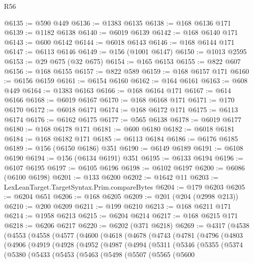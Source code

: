 \begin{lexlean}{R56}
\begin{coremodule}
@6135 := @590 @449
@6136 := @1383 @6135
@6138 := @168 @6136 @171
@6139 := @1182 @6138
@6140 := @6019 @6139
@6142 := @168 @6140 @171
@6143 := @600 @6142
@6144 := @6018 @6143
@6146 := @168 @6144 @171
@6147 := @6113 @6146
@6149 := @156 (@1001 @6147)
@6150 := @1013 @2595
@6153 := @29 @675 (@32 @675)
@6154 := @165 @6153
@6155 := @822 @607
@6156 := @168 @6155
@6157 := @822 @589
@6159 := @168 @6157 @171
@6160 := @6156 @6159
@6161 := @6154 @6160
@6162 := @164 @6161
@6163 := @608 @449
@6164 := @1383 @6163
@6166 := @168 @6164 @171
@6167 := @614 @6166
@6168 := @6019 @6167
@6170 := @168 @6168 @171
@6171 := @170 @6170
@6172 := @6018 @6171
@6174 := @168 @6172 @171
@6175 := @6113 @6174
@6176 := @6162 @6175
@6177 := @565 @6138
@6178 := @6019 @6177
@6180 := @168 @6178 @171
@6181 := @600 @6180
@6182 := @6018 @6181
@6184 := @168 @6182 @171
@6185 := @6113 @6184
@6186 := @6176 @6185
@6189 := @156 (@6150 @6186) @351
@6190 := @6149 @6189
@6191 := @6108 @6190
@6194 := @156 (@6134 @6191) @351
@6195 := @6133 @6194
@6196 := @6107 @6195
@6197 := @6105 @6196
@6198 := @6102 @6197
@6200 := @6086 (@6100 @6198)
@6201 := @133 @6200
@6202 := @1642 @11
@6203 := LexLeanTarget.TargetSyntax.Prim.compareBytes
@6204 := @179 @6203
@6205 := @6204 @651
@6206 := @168 @6205
@6209 := @201 (@204 (@2998 @213))
@6210 := @200 @6209
@6211 := @199 @6210
@6213 := @168 @6211 @171
@6214 := @1958 @6213
@6215 := @6204 @6214
@6217 := @168 @6215 @171
@6218 := @6206 @6217
@6220 := @6202 (@371 @6218)
@6269 := @4317
    (@4538
      (@4553
        (@4558
          (@4577
            (@4600
              (@4618
                (@4678
                  (@4743
                    (@4781
                      (@4796
                        (@4803
                          (@4906
                            (@4919
                              (@4928
                                (@4952
                                  (@4987
                                    (@4994
                                      (@5311
                                        (@5346
                                          (@5355
                                            (@5374
                                              (@5380
                                                (@5433
                                                  (@5453
                                                    (@5463
                                                      (@5498
                                                        (@5507
                                                          (@5565
                                                            (@5600

\end{coremodule}
\end{lexlean}
